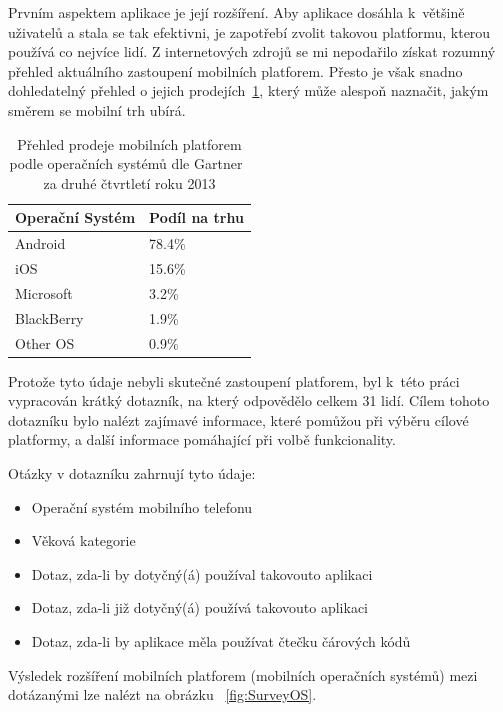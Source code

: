 \documentclass[thesis=B,czech]{FITthesis}[2013/10/20]
\begin{document}
Prvním aspektem aplikace je její rozšíření. Aby aplikace dosáhla k~většině uživatelů a stala se tak efektivni, je zapotřebí zvolit takovou platformu, kterou používá co nejvíce lidí. Z internetových zdrojů se mi nepodařilo získat rozumný přehled aktuálního zastoupení mobilních platforem. Přesto je však snadno dohledatelný přehled o jejich prodejích~\ref{table:MobilePlatf}, který může alespoň naznačit, jakým směrem se mobilní trh ubírá.

\begin{table}[H]
    \begin{tabular}{|l|l|}
    \hline
    Operační Systém & Podíl na trhu \\ \hline
    Android         & 78.4\%        \\ \hline
    iOS             & 15.6\%        \\ \hline
    Microsoft       & 3.2\%         \\ \hline
    BlackBerry      & 1.9\%         \\ \hline
    Other OS        & 0.9\%         \\ \hline
    \end{tabular}
    \caption{Přehled prodeje mobilních platforem podle operačních systémů dle Gartner~\cite{gartner} za druhé čtvrtletí roku 2013}
    \label{table:MobilePlatf}
\end{table}

Protože tyto údaje nebyli skutečné zastoupení platforem, byl k~této práci vypracován krátký dotazník, na který odpovědělo celkem 31 lidí. Cílem tohoto dotazníku bylo nalézt zajímavé informace, které pomůžou při výběru cílové platformy, a další informace pomáhající při volbě funkcionality.

Otázky v dotazníku zahrnují tyto údaje:
\begin{itemize}
	\item Operační systém mobilního telefonu
	\item Věková kategorie
	\item Dotaz, zda-li by dotyčný(á) používal takovouto aplikaci
	\item Dotaz, zda-li již dotyčný(á) používá takovouto aplikaci
	\item Dotaz, zda-li by aplikace měla používat čtečku čárových kódů
\end{itemize}

Výsledek rozšíření mobilních platforem (mobilních operačních systémů) mezi dotázanými lze nalézt na obrázku ~\ref{fig:SurveyOS}.
\end{document}

